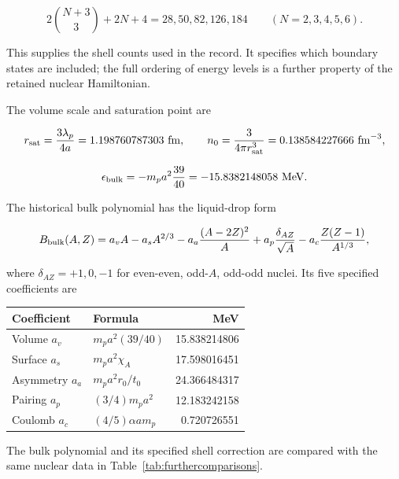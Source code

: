 \documentclass[aps,prx,onecolumn,10pt,notitlepage,nofootinbib,longbibliography]{revtex4-2}
\numberwithin{equation}{section}
\numberwithin{table}{section}
\begin{document}
\begin{equation}
2\binom{N+3}3+2N+4=28,50,82,126,184
\qquad(N=2,3,4,5,6).
\label{eq:attempt-S12-2}
\end{equation}

This supplies the shell counts used in the record. It specifies which boundary states are included; the full ordering of energy levels is a further property of the retained nuclear Hamiltonian.

The volume scale and saturation point are

\begin{equation}
r_{\rm sat}=\frac{3\lambda_p}{4a}=1.198760787303\ \mathrm{fm},\qquad
n_0=\frac3{4\pi r_{\rm sat}^3}=0.138584227666\ \mathrm{fm}^{-3},
\end{equation}

\begin{equation}
\epsilon_{\rm bulk}=-m_pa^2\frac{39}{40}=-15.8382148058\ \mathrm{MeV}.
\label{eq:attempt-S12-3}
\end{equation}

The historical bulk polynomial has the liquid-drop form

\begin{equation}
B_{\rm bulk}(A,Z)=a_vA-a_sA^{2/3}
-a_a\frac{(A-2Z)^2}{A}+a_p\frac{\delta_{AZ}}{\sqrt A}
-a_c\frac{Z(Z-1)}{A^{1/3}},
\label{eq:attempt-S12-4}
\end{equation}

where \(\delta_{AZ}=+1,0,-1\) for even-even, odd-\(A\), odd-odd nuclei. Its five specified coefficients are

\begingroup
\setlength{\LTpre}{3pt}
\begin{longtable}[]{@{}llr@{}}
\toprule\noalign{}
Coefficient & Formula & MeV \\
\midrule\noalign{}
\endhead
\bottomrule\noalign{}
\endlastfoot
Volume \(a_v\) & \(m_pa^2(39/40)\) & 15.838214806 \\
Surface \(a_s\) & \(m_pa^2\chi_A\) & 17.598016451 \\
Asymmetry \(a_a\) & \(m_pa^2 r_0/t_0\) & 24.366484317 \\
Pairing \(a_p\) & \((3/4)m_pa^2\) & 12.183242158 \\
Coulomb \(a_c\) & \((4/5)\alpha a m_p\) & 0.720726551 \\
\end{longtable}
\endgroup

The bulk polynomial and its specified shell correction are compared with
the same nuclear data in Table~\ref{tab:furthercomparisons}.
\end{document}
